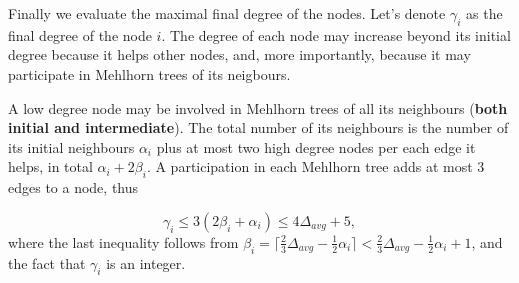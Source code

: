\documentclass{article}
\begin{document}
\medskip

Finally we evaluate the maximal final degree of the nodes.
Let's denote 
$\gamma_i$ as the final degree of the node $i$.
The degree of each node may increase beyond its initial degree because it helps other nodes, and, more importantly, because it may participate in Mehlhorn trees of its neigbours.

A low degree node may be involved in Mehlhorn trees of all its neighbours (\textbf{both initial and intermediate}). 
The total number of its neighbours is the number of its initial neighbours $\alpha_i$ plus at most two high degree nodes per each edge it helps, in total $\alpha_i + 2\beta_i$.
A participation in each Mehlhorn tree adds at most $3$ edges to a node, thus

  $$\gamma_i \leq 3(2\beta_i +\alpha_i) \leq 4\Delta_{avg} + 5,$$
  where the last inequality follows from 
  $\beta_i = \lceil\frac{2}{3}\Delta_{avg}-\frac{1}{2}\alpha_i\rceil < \frac{2}{3}\Delta_{avg} - \frac{1}{2}\alpha_i + 1$, and the fact that $\gamma_i$ is an integer.
\end{document}
